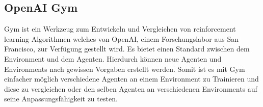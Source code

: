 \subsection{OpenAI Gym}
Gym \cite{gym} ist ein Werkzeug zum Entwickeln und Vergleichen von reinforcement learning Algorithmen welches von OpenAI, einem Forschungslabor aus San Francisco, zur Verfügung gestellt wird. Es bietet einen Standard zwischen dem Environment und dem Agenten. Hierdurch können neue Agenten und Environments nach gewissen Vorgaben erstellt werden. Somit ist es mit Gym einfacher möglich verschiedene Agenten an einem Environment zu Trainieren und diese zu vergleichen oder den selben Agenten an verschiedenen Environments auf seine Anpassungsfähigkeit zu testen.


